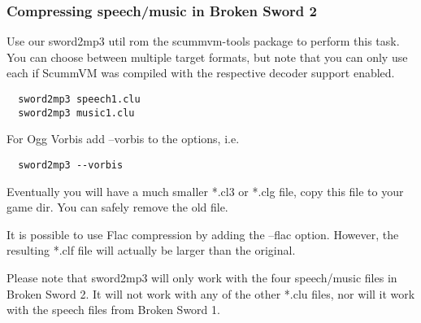 \subsubsection{Compressing speech/music in Broken Sword 2}

Use our sword2mp3 util rom the scummvm-tools package to perform this task.
You can choose between multiple target formats, but note  that you can only use
each if ScummVM was compiled with the respective decoder support enabled.

\begin{verbatim}
  sword2mp3 speech1.clu
  sword2mp3 music1.clu
\end{verbatim}
%
For Ogg Vorbis add --vorbis to the options, i.e.
\begin{verbatim}
  sword2mp3 --vorbis
\end{verbatim}
%
Eventually you will have a much smaller *.cl3 or *.clg file, copy this file to
your game dir. You can safely remove the old file.

It is possible to use Flac compression by adding the --flac option. However,
the resulting *.clf file will actually be larger than the original.

Please note that sword2mp3 will only work with the four speech/music files in
Broken Sword 2. It will not work with any of the other *.clu files, nor will it
work with the speech files from Broken Sword 1.

